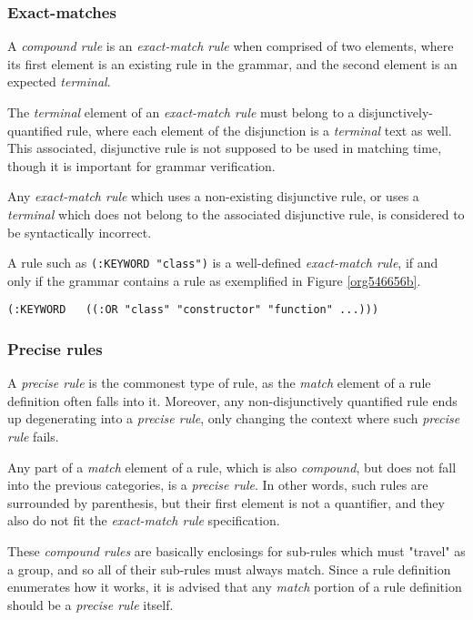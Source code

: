 \documentclass[a4paper,11pt,oneside]{article}
\begin{document}
\subsubsection*{Exact-matches}
\label{sec:org80f529e}

A \emph{compound rule} is an \emph{exact-match rule} when comprised of two elements,
where its first element is an existing rule in the grammar, and the
second element is an expected \emph{terminal}.

The \emph{terminal} element of an \emph{exact-match rule} must belong to a
disjunctively-quantified rule, where each element of the disjunction
is a \emph{terminal} text as well. This associated, disjunctive rule is not
supposed to be used in matching time, though it is important for
grammar verification.

Any \emph{exact-match rule} which uses a non-existing disjunctive rule, or
uses a \emph{terminal} which does not belong to the associated disjunctive
rule, is considered to be syntactically incorrect.

A rule such as \texttt{(:KEYWORD "class")} is a well-defined \emph{exact-match rule},
if and only if the grammar contains a rule as exemplified in Figure
\ref{org546656b}.

\begin{verbatim}
(:KEYWORD   ((:OR "class" "constructor" "function" ...)))
\end{verbatim}

\subsubsection*{Precise rules}
\label{sec:org88b13ae}

A \emph{precise rule} is the commonest type of rule, as the \emph{match}
element of a rule definition often falls into it. Moreover, any
non-disjunctively quantified rule ends up degenerating into a \emph{precise
rule}, only changing the context where such \emph{precise rule} fails.

Any part of a \emph{match} element of a rule, which is also \emph{compound}, but
does not fall into the previous categories, is a \emph{precise rule}. In
other words, such rules are surrounded by parenthesis, but their first
element is not a quantifier, and they also do not fit the \emph{exact-match
rule} specification.

These \emph{compound rules} are basically enclosings for sub-rules which must
"travel" as a group, and so all of their sub-rules must always
match. Since a rule definition enumerates how it works, it is advised
that any \emph{match} portion of a rule definition should be a \emph{precise rule}
itself.
\end{document}
